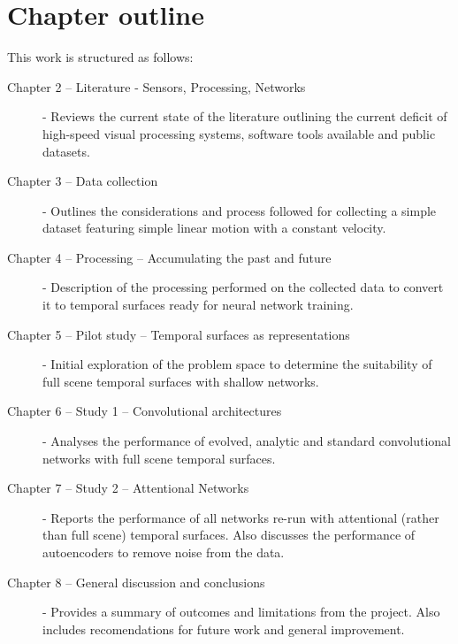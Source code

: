 \section{Chapter outline}
This work is structured as follows:
\begin{description}

\item [Chapter 2 -- Literature - Sensors, Processing, Networks] - Reviews the current state of the literature outlining the current deficit of high-speed visual processing systems, software tools available and public datasets. 

\item [Chapter 3 -- Data collection] - Outlines the considerations and process followed for collecting a simple dataset featuring simple linear motion with a constant velocity.

\item [Chapter 4 -- Processing -- Accumulating the past and future] - Description of the processing performed on the collected data to convert it to temporal surfaces ready for neural network training.

\item [Chapter 5 -- Pilot study -- Temporal surfaces as representations] - Initial exploration of the problem space to determine the suitability of full scene temporal surfaces with shallow networks.

\item [Chapter 6 -- Study 1 -- Convolutional architectures] - Analyses the performance of evolved, analytic and standard convolutional networks with full scene temporal surfaces. 

\item [Chapter 7 -- Study 2 -- Attentional Networks] - Reports the performance of all networks re-run with attentional (rather than full scene) temporal surfaces. Also discusses the performance of autoencoders to remove noise from the data.

\item [Chapter 8 -- General discussion and conclusions] - Provides a summary of outcomes and limitations from the project. Also includes recomendations for future work and general improvement.


\end{description}







